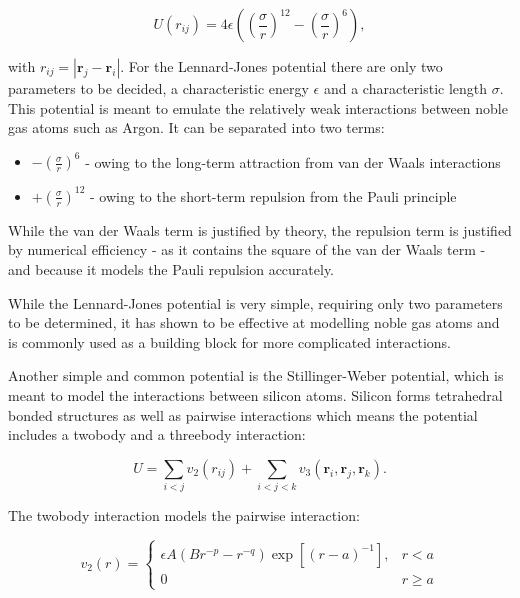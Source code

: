 $$ U(r_{ij}) = 4\epsilon \left(\left(\frac{\sigma}{r}\right)^{12}
    - \left(\frac{\sigma}{r}\right)^{6}\right) , $$

with $r_{ij} = \left| \bm{r}_j - \bm{r}_i \right|$.
For the Lennard-Jones potential there are only two parameters to be decided,
a characteristic energy $\epsilon$ and a characteristic length $\sigma$.
This potential is meant to emulate the relatively weak interactions
between noble gas atoms such as Argon.
It can be separated into two terms:

\begin{itemize}
    \item $\mathrel{-} \left(\frac{\sigma}{r}\right)^6$ - owing to the long-term
        attraction from van der Waals interactions
    \item $\mathrel{+} \left(\frac{\sigma}{r}\right)^{12}$ - owing to the short-term repulsion
        from the Pauli principle
\end{itemize}

While the van der Waals term is justified by theory, the repulsion term
is justified by numerical efficiency - as it contains the square of the van der Waals
term - and because it models the Pauli repulsion accurately.
\par
While the Lennard-Jones potential is very simple, requiring only two parameters
to be determined, it has shown to be effective at modelling noble gas atoms
and is commonly used as a building block for more complicated interactions.
\par
[cite \url{http://www.pages.drexel.edu/~cfa22/msim/node41.html}]
Another simple and common potential is the Stillinger-Weber potential,
which is meant to model the interactions between silicon atoms.
Silicon forms tetrahedral bonded structures as well as pairwise interactions
which means the potential includes a twobody and a threebody interaction:

\begin{equation}
    U = \sum_{i < j} v_2(r_{ij}) + \sum_{i < j < k} v_3(\bm{r}_i, \bm{r}_j, \bm{r}_k) .
\end{equation}

The twobody interaction models the pairwise interaction:

\begin{equation}
    v_2(r) =
    \begin{cases}
        \epsilon A (Br^{-p} - r^{-q}) \exp \left[ (r - a)^{-1} \right],
        & r < a \\
        0 & r \geq a
    \end{cases}
\end{equation}

